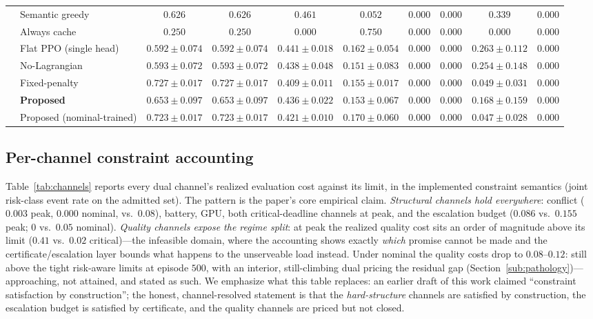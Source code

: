 \begin{table}[t]
\begin{tabular}{@{}llcccccccc@{}}
 & Semantic greedy & $0.626$ & $0.626$ & $0.461$ & $0.052$ & $0.000$ & $0.000$ & $0.339$ & $0.000$ \\
 & Always cache & $0.250$ & $0.250$ & $0.000$ & $0.750$ & $0.000$ & $0.000$ & $0.000$ & $0.000$ \\
 & Flat PPO (single head) & $0.592\pm0.074$ & $0.592\pm0.074$ & $0.441\pm0.018$ & $0.162\pm0.054$ & $0.000$ & $0.000$ & $0.263\pm0.112$ & $0.000$ \\
 & No-Lagrangian & $0.593\pm0.072$ & $0.593\pm0.072$ & $0.438\pm0.048$ & $0.151\pm0.083$ & $0.000$ & $0.000$ & $0.254\pm0.148$ & $0.000$ \\
 & Fixed-penalty & $0.727\pm0.017$ & $0.727\pm0.017$ & $0.409\pm0.011$ & $0.155\pm0.017$ & $0.000$ & $0.000$ & $0.049\pm0.031$ & $0.000$ \\
 & \textbf{Proposed} & $0.653\pm0.097$ & $0.653\pm0.097$ & $0.436\pm0.022$ & $0.153\pm0.067$ & $0.000$ & $0.000$ & $0.168\pm0.159$ & $0.000$ \\
 & Proposed (nominal-trained) & $0.723\pm0.017$ & $0.723\pm0.017$ & $0.421\pm0.010$ & $0.170\pm0.060$ & $0.000$ & $0.000$ & $0.047\pm0.028$ & $0.000$ \\
\bottomrule
\end{tabular}
\end{table}

\subsection{Per-channel constraint accounting}\label{sub:channels}
Table~\ref{tab:channels} reports every dual channel's realized evaluation
cost against its limit, in the implemented constraint semantics
(joint risk-class event rate on the admitted set). The pattern is the
paper's core empirical claim. \emph{Structural channels hold everywhere}:
conflict ($0.003$ peak, $0.000$ nominal, vs.\ $0.08$), battery, GPU, both
critical-deadline channels at peak, and the escalation budget ($0.086$ vs.\
$0.155$ peak; $0$ vs.\ $0.05$ nominal). \emph{Quality channels expose the
regime split}: at peak the realized quality cost sits an order of
magnitude above its limit ($0.41$ vs.\ $0.02$ critical)---the infeasible
domain, where the accounting shows exactly \emph{which} promise cannot be
made and the certificate/escalation layer bounds what happens to the
unserveable load instead. Under nominal the quality costs drop to
$0.08$--$0.12$: still above the tight risk-aware limits at episode $500$,
with an interior, still-climbing dual pricing the residual gap
(Section~\ref{sub:pathology})---approaching, not attained, and stated as
such. We emphasize what this table replaces: an earlier draft of this work
claimed ``constraint satisfaction by construction''; the honest,
channel-resolved statement is that the \emph{hard-structure} channels are
satisfied by construction, the escalation budget is satisfied by
certificate, and the quality channels are priced but not closed.

